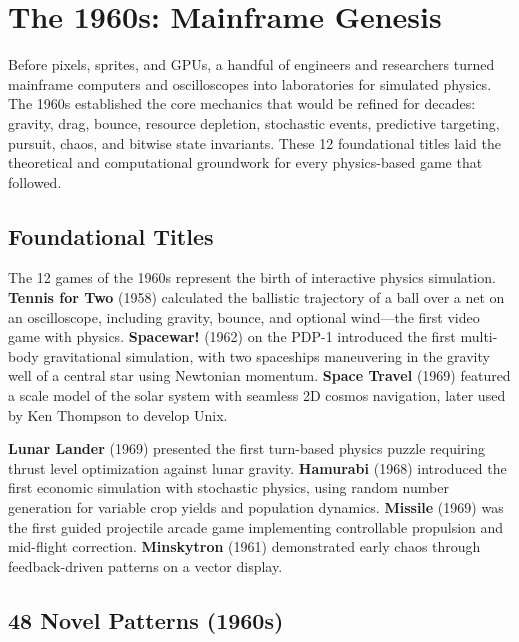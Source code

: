 \documentclass[11pt,a4paper]{article}
\theoremstyle{definition}
\begin{document}
\section{The 1960s: Mainframe Genesis}\label{sec:1960s}

Before pixels, sprites, and GPUs, a handful of engineers and researchers turned mainframe computers and oscilloscopes into laboratories for simulated physics. The 1960s established the core mechanics that would be refined for decades: gravity, drag, bounce, resource depletion, stochastic events, predictive targeting, pursuit, chaos, and bitwise state invariants. These 12 foundational titles laid the theoretical and computational groundwork for every physics-based game that followed.

\subsection{Foundational Titles}

The 12 games of the 1960s represent the birth of interactive physics simulation. \textbf{Tennis for Two} (1958) calculated the ballistic trajectory of a ball over a net on an oscilloscope, including gravity, bounce, and optional wind---the first video game with physics. \textbf{Spacewar!} (1962) on the PDP-1 introduced the first multi-body gravitational simulation, with two spaceships maneuvering in the gravity well of a central star using Newtonian momentum. \textbf{Space Travel} (1969) featured a scale model of the solar system with seamless 2D cosmos navigation, later used by Ken Thompson to develop Unix.

\textbf{Lunar Lander} (1969) presented the first turn-based physics puzzle requiring thrust level optimization against lunar gravity. \textbf{Hamurabi} (1968) introduced the first economic simulation with stochastic physics, using random number generation for variable crop yields and population dynamics. \textbf{Missile} (1969) was the first guided projectile arcade game implementing controllable propulsion and mid-flight correction. \textbf{Minskytron} (1961) demonstrated early chaos through feedback-driven patterns on a vector display.

\subsection{48 Novel Patterns (1960s)}
\end{document}
